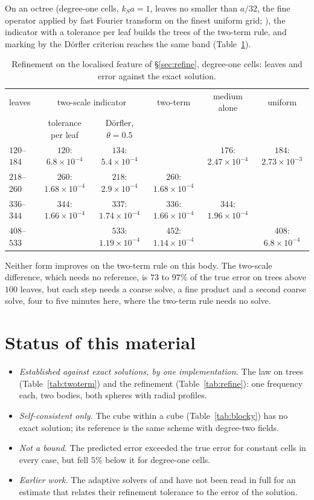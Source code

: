 \documentclass[11pt,a4paper]{article}
\begin{document}
On an octree (degree-one cells, $k_Sa=1$, leaves no smaller than $a/32$, the fine operator applied by fast
Fourier transform on the finest uniform grid; ), the
indicator with a tolerance per leaf builds the trees of the two-term rule, and marking by the D\"orfler
criterion reaches the same band (Table~\ref{tab:twoscale}).
\begin{table}[htbp]
\centering
\caption{Refinement on the localised feature of \S\ref{sec:refine}, degree-one cells: leaves and error
against the exact solution.}\label{tab:twoscale}
\small
\setlength{\tabcolsep}{3pt}
\begin{tabular}{@{}lccccc@{}}
\toprule
leaves & \multicolumn{2}{c}{two-scale indicator} & two-term & medium alone & uniform \\
 & tolerance per leaf & D\"orfler, $\theta=0.5$ & & & \\
\midrule
$120$--$184$ & $120$: $6.8\times10^{-4}$ & $134$: $5.4\times10^{-4}$ & & $176$: $2.47\times10^{-4}$ & $184$: $2.73\times10^{-3}$ \\
$218$--$260$ & $260$: $1.68\times10^{-4}$ & $218$: $2.9\times10^{-4}$ & $260$: $1.68\times10^{-4}$ & & \\
$336$--$344$ & $344$: $1.66\times10^{-4}$ & $337$: $1.74\times10^{-4}$ & $336$: $1.66\times10^{-4}$ & $344$: $1.96\times10^{-4}$ & \\
$408$--$533$ & & $533$: $1.19\times10^{-4}$ & $452$: $1.14\times10^{-4}$ & & $408$: $6.8\times10^{-4}$ \\
\bottomrule
\end{tabular}
\end{table}
Neither form improves on the two-term rule on this body. The two-scale difference, which needs no
reference, is $73$ to $97\%$ of the true error on trees above $100$ leaves, but each step needs a coarse
solve, a fine product and a second coarse solve, four to five minutes here, where the two-term rule needs
no solve.


\section{Status of this material}\label{sec:status}

\begin{itemize}
\item \emph{Established against exact solutions, by one implementation.} The law on trees
(Table~\ref{tab:twoterm}) and the refinement (Table~\ref{tab:refine}): one frequency each, two bodies,
both spheres with radial profiles.
\item \emph{Self-consistent only.} The cube within a cube (Table~\ref{tab:blocky}) has no exact
solution; its reference is the same scheme with degree-two fields.
\item \emph{Not a bound.} The predicted error exceeded the true error for constant cells in every case,
but fell $5\%$ below it for degree-one cells.
\item \emph{Earlier work.} The adaptive solvers of \citet{Ambikasaran2015} and \citet{Malhotra2016} have
not been read in full for an estimate that relates their refinement tolerance to the error of the
solution.
\end{itemize}
\end{document}
